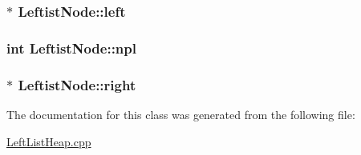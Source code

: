 \subsubsection[{\texorpdfstring{left}{left}}]{$\ast$ Leftist\+Node\+::left}\hypertarget{classLeftistNode_a62469c988fc0537dd6682d56f2108d99}{}\label{classLeftistNode_a62469c988fc0537dd6682d56f2108d99}
\subsubsection[{\texorpdfstring{npl}{npl}}]{\setlength{\rightskip}{0pt plus 5cm}int Leftist\+Node\+::npl}\hypertarget{classLeftistNode_afcd068d744065dc1201d1f738b923447}{}\label{classLeftistNode_afcd068d744065dc1201d1f738b923447}
\subsubsection[{\texorpdfstring{right}{right}}]{$\ast$ Leftist\+Node\+::right}\hypertarget{classLeftistNode_aee2ba46112890733b87007103122fc2a}{}\label{classLeftistNode_aee2ba46112890733b87007103122fc2a}


The documentation for this class was generated from the following file\+:\begin{DoxyCompactItemize}
\item 
\hyperlink{LeftListHeap_8cpp}{Left\+List\+Heap.\+cpp}\end{DoxyCompactItemize}
